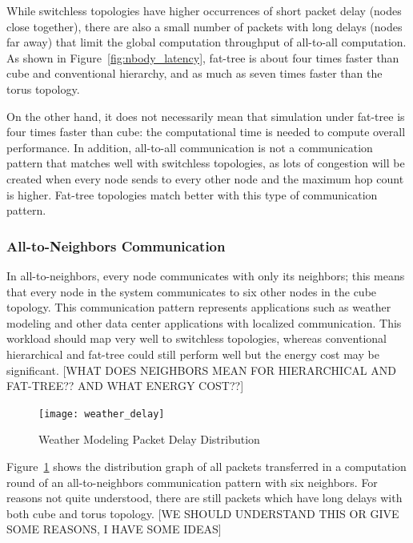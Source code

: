 While switchless topologies have higher occurrences of short packet delay (nodes close together), there are also a small number of packets with long delays (nodes far away) that limit the global computation throughput of all-to-all computation. As shown in Figure~\ref{fig:nbody_latency}, fat-tree is about four times faster than cube and conventional hierarchy, and as much as seven times faster than the torus topology.

On the other hand, it does not necessarily mean that simulation under fat-tree is four times faster than cube: the computational time is needed to compute overall performance.  In addition, all-to-all communication is not a communication pattern that matches well with switchless topologies, as lots of congestion will be created when every node sends to every other node and the maximum hop count is higher.  Fat-tree topologies match better with this type of communication pattern.

\subsubsection{All-to-Neighbors Communication}
In all-to-neighbors, every node communicates with only its neighbors; this means that every node in the system communicates to six other nodes in the cube topology. This communication pattern represents applications such as weather modeling and other data center applications with localized communication.  This workload should map very well to switchless topologies, whereas conventional hierarchical and fat-tree could still perform well but the energy cost may be significant. [WHAT DOES NEIGHBORS MEAN FOR HIERARCHICAL AND FAT-TREE?? AND WHAT ENERGY COST??]

\captionsetup[subfloat]{captionskip=-0.003in}
\begin{figure}
    \centering
    \texttt{[image: weather\_delay]}    
    \vspace{-0.1in}
    \caption{Weather Modeling Packet Delay Distribution}
    \label{fig:weather_packetdelay}
\end{figure}

Figure~\ref{fig:weather_packetdelay} shows the distribution graph of all packets transferred in a computation round of an all-to-neighbors communication pattern with six neighbors. For reasons not quite understood, there are still packets which have long delays with both cube and torus topology. [WE SHOULD UNDERSTAND THIS OR GIVE SOME REASONS, I HAVE SOME IDEAS]

